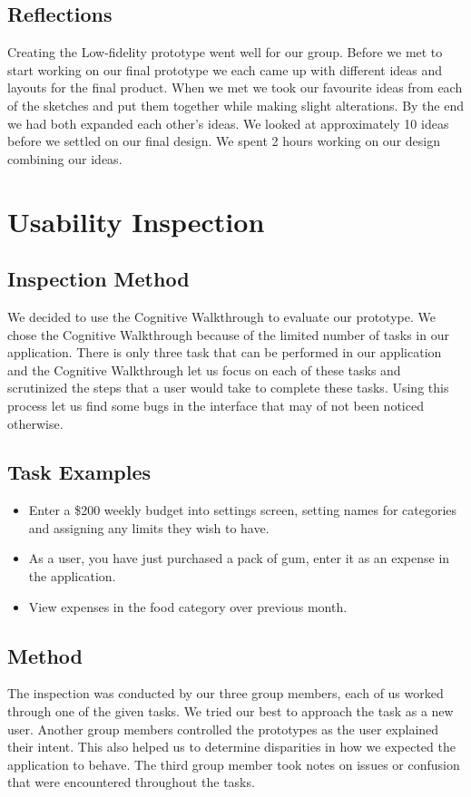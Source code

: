 \documentclass{chi2011}
\begin{document}
    \subsection{Reflections}

    Creating the Low-fidelity prototype went well for our group. Before we met
    to start working on our final prototype we each came up with different
    ideas and layouts for the final product. When we met we took our favourite
    ideas from each of the sketches and put them together while making slight
    alterations. By the end we had both expanded each other's ideas. We looked at
    approximately 10 ideas before we settled on our final design.
    We spent 2 hours working on our design combining our ideas.

\section{Usability Inspection}
    \subsection{Inspection Method}
    We decided to use the Cognitive Walkthrough to evaluate our prototype. We
	chose the Cognitive Walkthrough because of the limited number of tasks in
	our application. There is only three task that can be performed in our
	application and the Cognitive Walkthrough let us focus on each of these
	tasks and scrutinized the steps that a user would take to complete these
	tasks. Using this process let us find some bugs in the interface that may of
	not been noticed otherwise.

    \subsection{Task Examples}
    \begin{itemize}
        \item Enter a \$200 weekly budget into settings screen, setting names for categories and assigning any limits
            they wish to have.
        \item As a user, you have just purchased a pack of gum, enter it as an expense in the application.
        \item View expenses in the food category over previous month.
    \end{itemize}

    \subsection{Method}
    The inspection was conducted by our three group members, each of us worked through one of the given tasks. We
    tried our best to approach the task as a new user. Another group members controlled the prototypes as the user
    explained their intent. This also helped us to determine disparities in how we expected the application to behave.
    The third group member took notes on issues or confusion that were encountered throughout the tasks.
\end{document}
